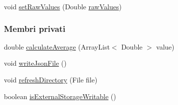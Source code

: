 \begin{DoxyCompactItemize}
\item 
void \hyperlink{classit_1_1unibo_1_1torsello_1_1bluetoothpositioning_1_1util_1_1ReportUtils_a6a65fe55f37edba3871801600cdf48f4_a6a65fe55f37edba3871801600cdf48f4}{set\+Raw\+Values} (Double \hyperlink{classit_1_1unibo_1_1torsello_1_1bluetoothpositioning_1_1util_1_1ReportUtils_adbe56bea0813a48932ef94b8b27c3314_adbe56bea0813a48932ef94b8b27c3314}{raw\+Values})
\end{DoxyCompactItemize}
\subsubsection*{Membri privati}
\begin{DoxyCompactItemize}
\item 
double \hyperlink{classit_1_1unibo_1_1torsello_1_1bluetoothpositioning_1_1util_1_1ReportUtils_a3585d9c21128af8bb2befe5cf069ba1e_a3585d9c21128af8bb2befe5cf069ba1e}{calculate\+Average} (Array\+List$<$ Double $>$ value)
\item 
void \hyperlink{classit_1_1unibo_1_1torsello_1_1bluetoothpositioning_1_1util_1_1ReportUtils_aa14b78ad82095e13e057308f4b5da594_aa14b78ad82095e13e057308f4b5da594}{write\+Json\+File} ()
\item 
void \hyperlink{classit_1_1unibo_1_1torsello_1_1bluetoothpositioning_1_1util_1_1ReportUtils_a5d2a51b68c3344f5aa41abaa118282b4_a5d2a51b68c3344f5aa41abaa118282b4}{refresh\+Directory} (File file)
\item 
boolean \hyperlink{classit_1_1unibo_1_1torsello_1_1bluetoothpositioning_1_1util_1_1ReportUtils_a58e7513f3cbe12723359b8dee541ed14_a58e7513f3cbe12723359b8dee541ed14}{is\+External\+Storage\+Writable} ()
\end{DoxyCompactItemize}
